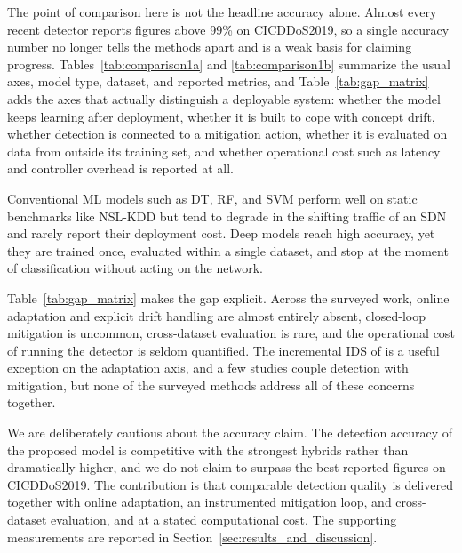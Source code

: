 \documentclass[ASNA,twocolumn]{USG} %
\begin{document}
The point of comparison here is not the headline accuracy alone. Almost every recent detector reports figures above 99\% on CICDDoS2019, so a single accuracy number no longer tells the methods apart and is a weak basis for claiming progress. Tables~\ref{tab:comparison1a} and \ref{tab:comparison1b} summarize the usual axes, model type, dataset, and reported metrics, and Table~\ref{tab:gap_matrix} adds the axes that actually distinguish a deployable system: whether the model keeps learning after deployment, whether it is built to cope with concept drift, whether detection is connected to a mitigation action, whether it is evaluated on data from outside its training set, and whether operational cost such as latency and controller overhead is reported at all.

Conventional ML models such as DT, RF, and SVM \cite{tan2020new, khashab2021ddos, nadeem2022ddos} perform well on static benchmarks like NSL-KDD but tend to degrade in the shifting traffic of an SDN and rarely report their deployment cost. Deep models \cite{priyadarshini2023sdn, hnamte2024enhancing, habib2024time, elubeyd2023hybrid, xu2025deep} reach high accuracy, yet they are trained once, evaluated within a single dataset, and stop at the moment of classification without acting on the network.

Table~\ref{tab:gap_matrix} makes the gap explicit. Across the surveyed work, online adaptation and explicit drift handling are almost entirely absent, closed-loop mitigation is uncommon, cross-dataset evaluation is rare, and the operational cost of running the detector is seldom quantified. The incremental IDS of \cite{alqahtani2024incremental} is a useful exception on the adaptation axis, and a few studies \cite{wang2024detection, hnamte2024ddos} couple detection with mitigation, but none of the surveyed methods address all of these concerns together.

We are deliberately cautious about the accuracy claim. The detection accuracy of the proposed model is competitive with the strongest hybrids rather than dramatically higher, and we do not claim to surpass the best reported figures on CICDDoS2019. The contribution is that comparable detection quality is delivered together with online adaptation, an instrumented mitigation loop, and cross-dataset evaluation, and at a stated computational cost. The supporting measurements are reported in Section~\ref{sec:results_and_discussion}.
\end{document}
